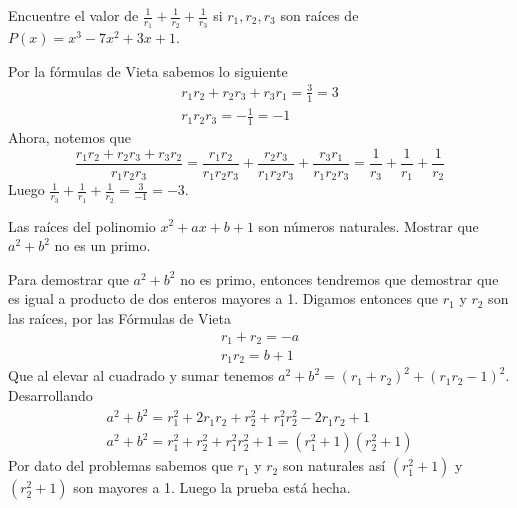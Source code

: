 \begin{section-example.tcb}
    Encuentre el valor de $\frac{1}{r_1} + \frac{1}{r_2} + \frac{1}{r_3}$ si $r_1, r_2, r_3$ son raíces de $P(x) = x^3 - 7 x^2 + 3x + 1$.
\end{section-example.tcb}
\begin{solution}
    Por la fórmulas de Vieta sabemos lo siguiente
    \begin{gather*}
        r_1 r_2 + r_2 r_3 + r_3 r_1 = \frac{3}{1} = 3 \\
        r_1 r_2 r_3 = - \frac{1}{1} = -1
    \end{gather*}
    Ahora, notemos que
    \[\frac{r_1 r_2 + r_2 r_3 + r_3 r_2}{r_1 r_2 r_3} = \frac{r_1 r_2}{r_1 r_2 r_3} + \frac{r_2 r_3}{r_1 r_2 r_3} + \frac{r_3 r_1}{r_1 r_2 r_3} = \frac{1}{r_3} + \frac{1}{r_1} + \frac{1}{r_2}\]
    Luego $\frac{1}{r_3} + \frac{1}{r_1} + \frac{1}{r_2} = \frac{3}{-1} = \boxed{-3}.$
\end{solution}

\begin{section-example.tcb}[1986 URSS]
    Las raíces del polinomio $x^2 + ax + b + 1$ son números naturales. Mostrar que $a^2 + b^2$ no es un primo.
\end{section-example.tcb}
\begin{solution}
    Para demostrar que $a^2 + b^2$ no es primo, entonces tendremos que demostrar que es igual a producto de dos enteros mayores a 1.
    Digamos entonces que $r_1$ y $r_2$ son las raíces, por las Fórmulas de Vieta
    \begin{gather*}
        r_1 + r_2 = -a\\
        r_1 r_2 = b + 1
    \end{gather*}
    Que al elevar al cuadrado y sumar tenemos $a^2 + b^2 = (r_1 + r_2)^2 + (r_1 r_2 - 1)^2$.
    Desarrollando
    \begin{gather*}
        a^2 + b^2 = r^2_1 + 2r_1 r_2 + r^2_2 + r^2_1 r^2_2 - 2r_1 r_2 + 1 \\
        a^2 + b^2 = r^2_1 + r^2_2 + r^2_1 r^2_2+ 1 = \boxed{(r^2_1 + 1)(r^2_2 + 1)}
    \end{gather*}
    Por dato del problemas sabemos que $r_1$ y $r_2$ son naturales así $(r^2_1 + 1)$ y $(r^2_2 + 1)$ son mayores a 1.
    Luego la prueba está hecha.
\end{solution}

